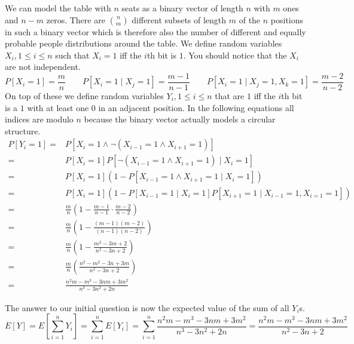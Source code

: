 \documentclass[10pt,a4paper]{article}
\begin{document}
We can model the table with $n$ seats as a binary vector of length $n$ with $m$ ones and $n - m$ zeros.
There are $\binom{n}{m}$ different subsets of length $m$ of the $n$ positions in such a binary vector which is therefore also the number of different and equally probable people distributions around the table.
We define random variables $X_{i}, 1 \le i \le n$ such that $X_{i} = 1$ iff the $i$th bit is $1$.
You should notice that the $X_{i}$ are not independent.
\begin{equation*}
  P[X_{i} = 1] = \frac{m}{n} \qquad P[X_{i} = 1 \mid X_{j} = 1] = \frac{m - 1}{n - 1} \qquad P[X_{i} = 1 \mid X_{j} = 1, X_{k} = 1] = \frac{m - 2}{n - 2}
\end{equation*}
On top of these we define random variables $Y_{i}, 1 \le i \le n$ that are $1$ iff the $i$th bit is a $1$ with at least one $0$ in an adjacent position.
In the following equations all indices are modulo $n$ because the binary vector actually models a circular structure.
\begin{align*}
  P[Y_{i} = 1] = & P[X_{i} = 1 \land \lnot (X_{i - 1} = 1 \land X_{i + 1} = 1)]\\
  = & P[X_{i} = 1] P[\lnot (X_{i - 1} = 1 \land X_{i + 1} = 1) \mid X_{i} = 1]\\
  = & P[X_{i} = 1] \left( 1 - P[X_{i - 1} = 1 \land X_{i + 1} = 1 \mid X_{i} = 1] \right)\\
  = & P[X_{i} = 1] \left( 1 - P[X_{i - 1} = 1 \mid X_{i} = 1] P[X_{i + 1} = 1 \mid X_{i - 1} = 1, X_{i = 1} = 1] \right)\\
  = & \frac{m}{n} \left( 1 - \frac{m - 1}{n - 1} \cdot \frac{m - 2}{n - 2} \right)\\
  = & \frac{m}{n} \left( 1 - \frac{(m - 1)(m - 2)}{(n - 1)(n - 2)} \right)\\
  = & \frac{m}{n} \left( 1 - \frac{m^{2} - 3m + 2}{n^{2} - 3n + 2} \right)\\
  = & \frac{m}{n} \left( \frac{n^{2} - m^{2}- 3n + 3m}{n^{2} - 3n + 2} \right)\\
  = & \frac{n^{2}m - m^{3}- 3nm + 3m^{2}}{n^{3} - 3n^{2} + 2n}
\end{align*}

The answer to our initial question is now the expected value of the sum of all $Y_{i}$s.
\begin{equation*}
  E[Y] = E\left[ \sum_{i = 1}^{n} Y_{i} \right] = \sum_{i = 1}^{n} E[Y_{i}] = \sum_{i = 1}^{n} \frac{n^{2}m - m^{3}- 3nm + 3m^{2}}{n^{3} - 3n^{2} + 2n} = \frac{n^{2}m - m^{3}- 3nm + 3m^{2}}{n^{2} - 3n + 2}
\end{equation*}
\end{document}
